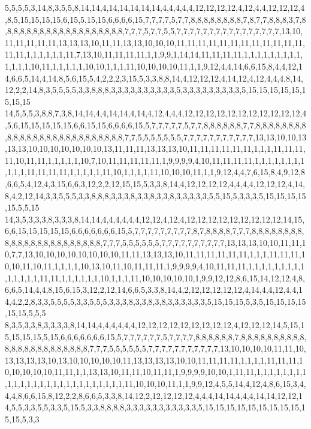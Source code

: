 5,5,5,5,3,14,8,3,5,5,8,14,14,4,14,14,14,14,14,4,4,4,4,4,12,12,12,12,4,12,4,4,12,12,12,4,8,5,15,15,15,15,6,15,5,15,15,6,6,6,6,15,7,7,7,7,5,7,7,8,8,8,8,8,8,8,8,7,8,7,7,8,8,8,3,7,8,8,8,8,8,8,8,8,8,8,8,8,8,8,8,8,8,8,8,7,7,7,5,7,7,5,5,7,7,7,7,7,7,7,7,7,7,7,7,7,7,7,7,13,10,11,11,11,11,11,13,13,13,10,11,11,13,13,10,10,10,11,11,11,11,11,11,11,11,11,11,11,11,11,11,1,1,1,1,1,1,11,7,13,10,11,11,11,11,1,1,9,9,1,14,14,11,11,11,11,1,1,1,1,1,1,1,1,1,1,1,1,1,10,11,1,1,1,1,1,10,10,1,1,1,11,10,10,10,10,11,1,1,9,12,4,4,14,6,6,15,8,4,4,12,14,6,6,5,14,4,14,8,5,6,15,5,4,2,2,2,3,15,5,3,3,8,8,14,4,12,12,12,4,14,12,4,12,4,4,4,8,14,12,2,2,14,8,3,5,5,5,5,3,3,8,8,8,3,3,3,3,3,3,3,3,3,3,5,3,3,3,3,3,3,3,3,3,5,15,15,15,15,15,15,15,15
14,5,5,5,3,8,8,7,3,8,14,14,4,4,14,14,4,14,4,12,4,4,4,12,12,12,12,12,12,12,12,12,12,12,4,5,6,15,15,15,15,15,6,6,15,15,6,6,6,6,15,5,7,7,7,7,7,5,7,7,8,8,8,8,8,8,7,7,8,8,8,8,8,8,8,8,8,8,8,8,8,8,8,8,8,8,8,8,8,8,8,8,8,8,7,7,5,5,5,5,5,5,5,7,7,7,7,7,7,7,7,7,7,7,13,13,10,10,13,13,13,10,10,10,10,10,10,10,13,11,11,11,13,13,13,10,11,11,11,11,11,11,1,1,1,11,11,11,11,10,11,11,1,1,1,1,1,10,7,10,11,11,11,11,11,1,9,9,9,9,4,10,11,11,11,11,1,1,1,1,1,1,1,1,1,1,1,11,11,11,11,1,1,1,1,1,11,10,1,1,1,1,11,10,10,10,11,1,1,9,12,4,4,7,6,15,8,4,9,12,8,6,6,5,4,12,4,3,15,6,6,3,12,2,2,12,15,15,5,3,3,8,14,4,12,12,12,12,4,4,4,4,12,12,12,4,14,8,4,2,12,14,3,3,5,5,5,3,3,8,8,8,3,3,3,8,3,3,8,3,3,8,3,3,3,3,3,5,5,15,5,3,3,3,5,15,15,15,15,15,5,5,15
14,3,5,3,3,3,8,3,3,3,8,14,14,4,4,4,4,4,4,12,12,4,12,4,12,12,12,12,12,12,12,12,12,14,15,6,6,15,15,15,15,15,6,6,6,6,6,6,6,15,5,7,7,7,7,7,7,7,7,7,8,7,8,8,8,8,7,7,7,8,8,8,8,8,8,8,8,8,8,8,8,8,8,8,8,8,8,8,8,8,8,8,7,7,7,5,5,5,5,5,5,7,7,7,7,7,7,7,7,7,7,13,13,13,10,10,11,11,10,7,7,13,10,10,10,10,10,10,10,10,11,11,13,13,13,10,11,11,11,11,11,11,1,1,1,11,11,11,10,10,11,10,11,1,1,1,1,10,13,10,11,10,11,11,11,1,9,9,9,9,4,10,11,11,11,1,1,1,1,1,1,1,1,1,1,1,1,1,1,11,11,1,1,1,1,1,1,10,1,1,1,11,10,10,10,10,10,1,9,9,12,12,8,6,15,14,12,12,4,8,6,6,5,14,4,4,8,15,6,15,3,12,2,12,14,6,6,5,3,3,8,14,4,2,12,12,12,12,12,4,14,4,4,12,4,4,14,4,2,2,8,3,3,5,5,5,5,3,3,5,5,5,3,3,3,8,3,3,8,3,8,3,3,3,3,3,3,5,15,15,15,5,3,5,15,15,15,15,15,15,5,5,5
8,3,5,3,3,8,3,3,3,3,8,14,14,4,4,4,4,4,4,12,12,12,12,12,12,12,12,12,4,12,12,12,14,5,15,15,15,15,15,5,15,6,6,6,6,6,6,6,15,5,7,7,7,7,7,7,5,7,7,7,7,8,8,8,8,8,8,7,8,8,8,8,8,8,8,8,8,8,8,8,8,8,8,8,8,8,8,8,8,8,8,7,7,7,5,5,5,5,5,5,7,7,7,7,7,7,7,7,7,7,7,13,10,10,10,10,11,11,10,13,13,13,13,10,13,10,10,10,10,10,11,13,13,13,13,10,10,11,11,11,11,1,1,1,1,11,11,11,10,10,10,10,10,11,11,1,1,13,13,10,11,11,10,11,11,1,9,9,9,9,10,10,1,11,11,1,1,1,1,1,1,1,1,1,1,1,1,1,1,1,1,1,1,1,1,1,1,1,1,1,1,11,10,10,10,11,1,1,9,9,12,4,5,5,14,4,12,4,8,6,15,3,4,4,4,8,6,6,15,8,12,2,2,8,6,6,5,3,3,8,14,12,2,12,12,12,12,4,4,4,14,14,4,4,4,14,14,12,12,14,5,5,3,3,5,5,3,3,5,15,5,3,3,8,8,8,8,3,3,3,3,3,3,3,3,3,3,3,5,15,15,15,15,15,15,15,15,15,15,15,5,3,3
